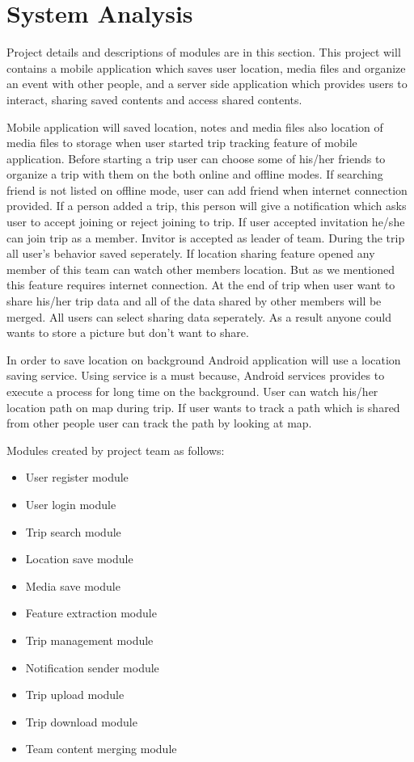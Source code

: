 \chapter{System Analysis}
Project details and descriptions of modules are in this section.
This project will contains a mobile application which saves user location, media files and organize an event with other people, and a server side application which provides users to interact, sharing saved contents and access shared contents. 

Mobile application will saved location, notes and media files also location of media files to storage when user started trip tracking feature of mobile application. Before starting a trip user can choose some of his/her friends to organize a trip with them on the both online and offline modes. If searching friend is not listed on offline mode, user can add friend when internet connection provided. If a person added a trip, this person will give a notification which asks user to accept joining or reject joining to trip. If user accepted invitation he/she can join trip as a member. Invitor is accepted as leader of team. During the trip all user's behavior saved seperately. If location sharing feature opened any member of this team can watch other members location. But as we mentioned this feature requires internet connection. At the end of trip when user want to share his/her trip data and all of the data shared by other members will be merged. All users can select sharing data seperately. As a result anyone could wants to store a picture but don't want to share. 

In order to save location on background Android application will use a location saving service. Using service is a must because, Android services provides to execute a process for long time on the background. User can watch his/her location path on map during trip. If user wants to track a path which is shared from other people user can track the path by looking at map.

Modules created by project team as follows:
\begin{itemize}
    \item User register module
    \item User login module
    \item Trip search module
    \item Location save module
    \item Media save module
    \item Feature extraction module
    \item Trip management module
    \item Notification sender module
    \item Trip upload module
    \item Trip download module
    \item Team content merging module
\end{itemize}

